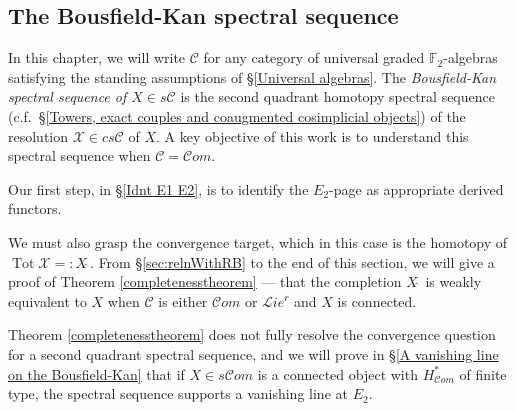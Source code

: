 \documentclass[11pt]{amsart} \renewcommand{\baselinestretch}{1.4}
\theoremstyle{plain}
\theoremstyle{definition}
\DeclareMathOperator{\Tot}{Tot}
\newcommand{\scrL}{\mathscr{L}}
\newcommand{\scrC}{\mathscr{C}}
\newcommand{\calC}{\mathcal{C}}
\newcommand{\calx}{\mathcal{X}}
\newcommand{\calc}{\mathcal{C}}
\newcommand{\F}{\mathbb{F}}
\newcommand{\algs}{{\scrC\!\textit{om}}}
\newcommand{\restliealgs}{{\scrL\!\textit{ie}^\textit{r}}}
\newcommand{\algcat}{{\calc}}%
\newcommand{\Ftwo}{\F_2}
\begin{document}
\begin{Bousfield-Kan spectral sequence}
\section{\textbf{The Bousfield-Kan spectral sequence}}
\label{Bousfield-Kan spectral sequence}

In this chapter, we will write $\algcat$ for any category of universal graded $\Ftwo $-algebras satisfying the standing assumptions of \S\ref{Universal algebras}. The \emph{Bousfield-Kan spectral sequence of $X\in s\algcat$} is the second quadrant homotopy spectral sequence (c.f.\ \S\ref{Towers, exact couples and coaugmented cosimplicial objects}) of the resolution $\calx\in cs\algcat$ of $X$.
A key objective of this work is to understand this spectral sequence when $\calc=\algs$.

Our first step, in \S\ref{Idnt E1 E2}, is to identify the $E_2$-page as appropriate derived functors.

We must also grasp the convergence target, which in this case is the homotopy of $\Tot \calx=:X\hat{\ }$. From \S\ref{sec:relnWithRB} to the end of this section, we will give a proof of Theorem \ref{completenesstheorem} --- that the completion $X\hat{\ } $ is weakly equivalent to $X$ when $\calC$ is either $\algs$ or $\restliealgs$ and $X$ is connected.

Theorem \ref{completenesstheorem} does not fully resolve the convergence question for a second quadrant spectral sequence, and we will prove in \S\ref{A vanishing line on the Bousfield-Kan} that if $X\in s\algs$ is a connected object with $H^*_\algs$ of finite type, the spectral sequence supports a vanishing line at $E_2$.





\end{Bousfield-Kan spectral sequence}
\end{document}
